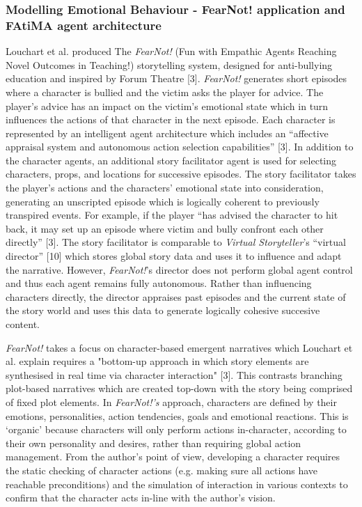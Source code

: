 \documentclass{sig-alternate-05-2015}
\begin{document}
\subsubsection{Modelling Emotional Behaviour - FearNot! application and FAtiMA agent architecture}
Louchart et al. produced The \textit{FearNot!} (Fun with Empathic Agents Reaching Novel Outcomes in Teaching!) storytelling system, designed for anti-bullying education and inspired by Forum Theatre [3]. \textit{FearNot!} generates short episodes where a character is bullied and the victim asks the player for advice. The player's advice has an impact on the victim's emotional state which in turn influences the actions of that character in the next episode. Each character is represented by an intelligent agent architecture which includes an ``affective appraisal system and autonomous action selection capabilities'' [3]. In addition to the character agents, an additional story facilitator agent is used for selecting characters, props, and locations for successive episodes. The story facilitator takes the player's actions and the characters' emotional state into consideration, generating an unscripted episode which is logically coherent to previously transpired events. For example, if the player ``has advised the character to hit back, it may set up an episode where victim and bully confront each other directly'' [3]. The story facilitator is comparable to \textit{Virtual Storyteller}'s ``virtual director'' [10] which stores global story data and uses it to influence and adapt the narrative. However, \textit{FearNot!}'s director does not perform global agent control and thus each agent remains fully autonomous. Rather than influencing characters directly, the director appraises past episodes and the current state of the story world and uses this data to generate logically cohesive succesive content.

\textit{FearNot!} takes a focus on character-based emergent narratives which Louchart et al. explain requires a "bottom-up approach in which story elements are synthesised in real time via character interaction" [3]. This contrasts branching plot-based narratives which are created top-down with the story being comprised of fixed plot elements. In \textit{FearNot!'s} approach, characters are defined by their emotions, personalities, action tendencies, goals and emotional reactions. This is `organic' because characters will only perform actions in-character, according to their own personality and desires, rather than requiring global action management. From the author's point of view, developing a character requires the static checking of character actions (e.g. making sure all actions have reachable preconditions) and the simulation of interaction in various contexts to confirm that the character acts in-line with the author's vision.
\end{document}
